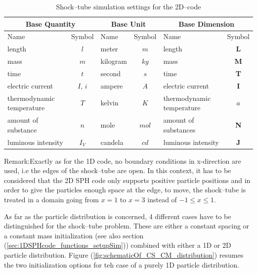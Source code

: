 \documentclass{report}
\begin{document}
\begin{table}[h] %
\label{tab:SimuSettings_Shock}
\centering

\begin{tabular}[c]{|l c|l c|l c|} %
\hline
\hline
\multicolumn{2}{|c|}{\textbf{Base Quantity}} & \multicolumn{2}{|c|}{\textbf{Base Unit}} & \multicolumn{2}{|c|}{\textbf{Base Dimension}}\\
\hline
Name & Symbol & Name & Symbol & Name & Symbol\\
\hline
\hline
length & $l$ & meter & $m$ & length & {\bf L}\\

mass & $m$ & kilogram & $kg$ & mass & {\bf M} \\

time & $t$ & second & $s$ & time & {\bf T}\\

electric current & {$I$, $i$} & ampere & $A$ & electric current & {\bf I}\\

thermodynamic temperature & $T$ & kelvin & $K$ & thermodynamic temperature & $a$\\

amount of substance & $n$ & mole & $mol$ & amount of substances & {\bf N}\\

luminous intensity & $I_V$ & candela & $cd$ & luminous intensity & {\bf J}\\
\hline
\hline
\end{tabular}
\caption[]{Shock--tube simulation settings for the 2D--code}

\end{table}
Remark:Exactly as for the 1D code, no boundary conditions in x-direction are used, i.e the edges of the shock--tube are open. In this context, it has to be considered that the 2D SPH code only supports positive particle positions and in order to give the particles enough space at the edge, to move, the shock--tube is treated in a domain going from $x=1$ to $x=3$ instead of $-1\leq x\leq1$. 

As far as the particle distribution is concerned, 4 different cases have to be distinguished for the shock--tube problem. These are either a constant spacing or a constant mass initialization (see also section (\ref{sec:1DSPHcode_functions_setupSim})) combined with either a 1D or 2D particle distribution.
Figure (\ref{fig:schematicOf_CS_CM_distribution}) resumes the two initialization options for teh case of a purely 1D particle distribution.
\end{document}

